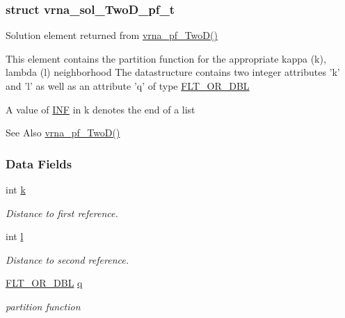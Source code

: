 \subsubsection{struct vrna\-\_\-sol\-\_\-\-Two\-D\-\_\-pf\-\_\-t}
Solution element returned from \hyperlink{group__kl__neighborhood__pf_ga0bc3427689bd09da09b8b3094a27f836}{vrna\-\_\-pf\-\_\-\-Two\-D()} 

This element contains the partition function for the appropriate kappa (k), lambda (l) neighborhood The datastructure contains two integer attributes 'k' and 'l' as well as an attribute 'q' of type \hyperlink{group__data__structures_ga31125aeace516926bf7f251f759b6126}{F\-L\-T\-\_\-\-O\-R\-\_\-\-D\-B\-L}

A value of \hyperlink{energy__const_8h_a12c2040f25d8e3a7b9e1c2024c618cb6}{I\-N\-F} in k denotes the end of a list

\begin{DoxySeeAlso}{See Also}
\hyperlink{group__kl__neighborhood__pf_ga0bc3427689bd09da09b8b3094a27f836}{vrna\-\_\-pf\-\_\-\-Two\-D()} 
\end{DoxySeeAlso}
\subsubsection*{Data Fields}
\begin{DoxyCompactItemize}
\item 
\hypertarget{group__kl__neighborhood__pf_ad1f23b46dc4ebd373abdeb0382d87b83}{int \hyperlink{group__kl__neighborhood__pf_ad1f23b46dc4ebd373abdeb0382d87b83}{k}}\label{group__kl__neighborhood__pf_ad1f23b46dc4ebd373abdeb0382d87b83}

\begin{DoxyCompactList}\small\item\em Distance to first reference. \end{DoxyCompactList}\item 
\hypertarget{group__kl__neighborhood__pf_a01133c264eff2c988d144e07803d1b8b}{int \hyperlink{group__kl__neighborhood__pf_a01133c264eff2c988d144e07803d1b8b}{l}}\label{group__kl__neighborhood__pf_a01133c264eff2c988d144e07803d1b8b}

\begin{DoxyCompactList}\small\item\em Distance to second reference. \end{DoxyCompactList}\item 
\hypertarget{group__kl__neighborhood__pf_a17ebbf425b8769ded74b5c7b85e58ee1}{\hyperlink{group__data__structures_ga31125aeace516926bf7f251f759b6126}{F\-L\-T\-\_\-\-O\-R\-\_\-\-D\-B\-L} \hyperlink{group__kl__neighborhood__pf_a17ebbf425b8769ded74b5c7b85e58ee1}{q}}\label{group__kl__neighborhood__pf_a17ebbf425b8769ded74b5c7b85e58ee1}

\begin{DoxyCompactList}\small\item\em partition function \end{DoxyCompactList}\end{DoxyCompactItemize}


